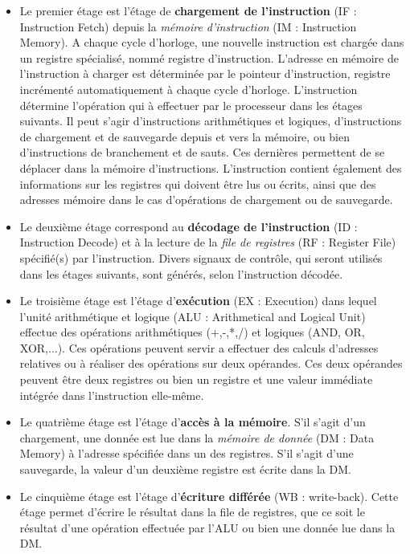 \begin{itemize}
  \item Le premier étage est l'étage de \textbf{chargement de l'instruction} (IF : Instruction Fetch) depuis la \textit{mémoire d'instruction} (IM : Instruction Memory). A chaque cycle d'horloge, une nouvelle instruction est chargée dans un registre spécialisé, nommé registre d'instruction. L'adresse en mémoire de l'instruction à charger est déterminée par le pointeur d'instruction, registre incrémenté automatiquement à chaque cycle d'horloge. L'instruction détermine l'opération qui à effectuer par le processeur dans les étages suivants. Il peut s'agir d'instructions arithmétiques et logiques, d'instructions de chargement et de sauvegarde depuis et vers la mémoire, ou bien d'instructions de branchement et de sauts. Ces dernières permettent de se déplacer dans la mémoire d'instructions. L'instruction contient également des informations sur les registres qui doivent être lus ou écrits, ainsi que des adresses mémoire dans le cas d'opérations de chargement ou de sauvegarde.

  \item Le deuxième étage correspond au \textbf{décodage de l'instruction} (ID : Instruction Decode) et à la lecture de la \textit{file de registres} (RF : Register File) spécifié(s) par l'instruction. Divers signaux de contrôle, qui seront utilisés dans les étages suivants, sont générés, selon l'instruction décodée.

  \item Le troisième étage est l'étage d'\textbf{exécution} (EX : Execution) dans lequel l'unité arithmétique et logique (ALU : Arithmetical and Logical Unit) effectue des opérations arithmétiques (+,-,*,/) et logiques (AND, OR, XOR,...). Ces opérations peuvent servir a effectuer des calculs d'adresses relatives ou à réaliser des opérations sur deux opérandes. Ces deux opérandes peuvent être deux registres ou bien un registre et une valeur immédiate intégrée dans l'instruction elle-même.

  \item Le quatrième étage est l'étage d'\textbf{accès à la mémoire}. S'il s'agit d'un chargement, une donnée est lue dans la \textit{mémoire de donnée} (DM : Data Memory) à l'adresse spécifiée dans un des registres. S'il s'agit d'une sauvegarde, la valeur d'un deuxième registre est écrite dans la DM.

  \item Le cinquième étage est l'étage d'\textbf{écriture différée} (WB : write-back). Cette étage permet d'écrire le résultat dans la file de registres, que ce soit le résultat d'une opération effectuée par l'ALU ou bien une donnée lue dans la DM.
\end{itemize}

